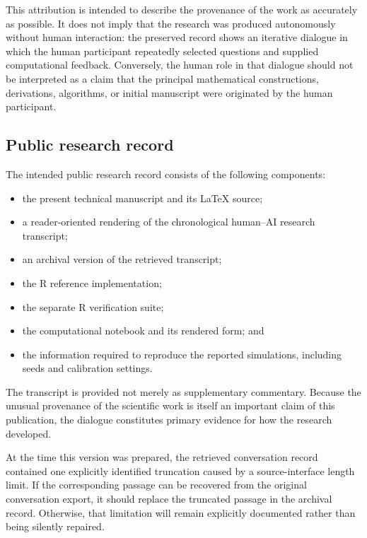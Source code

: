 \documentclass[11pt]{article}
\begin{document}
This attribution is intended to describe the provenance of the work as
accurately as possible.  It does not imply that the research was
produced autonomously without human interaction: the preserved record 
shows an iterative dialogue in which the human participant repeatedly
selected questions and supplied computational feedback.  Conversely,
the human role in that dialogue should not be interpreted as a claim
that the principal mathematical constructions, derivations, algorithms,
or initial manuscript were originated by the human participant.

\subsection*{Public research record}

The intended public research record consists of the following
components:

\begin{itemize}
    \item the present technical manuscript and its \LaTeX{} source;
    \item a reader-oriented rendering of the chronological
          human--AI research transcript;
    \item an archival version of the retrieved transcript;
    \item the R reference implementation;
    \item the separate R verification suite;
    \item the computational notebook and its rendered form; and
    \item the information required to reproduce the reported
          simulations, including seeds and calibration settings.
\end{itemize}

The transcript is provided not merely as supplementary commentary.
Because the unusual provenance of the scientific work is itself an
important claim of this publication, the dialogue constitutes primary
evidence for how the research developed.

At the time this version was prepared, the retrieved conversation
record contained one explicitly identified truncation caused by a
source-interface length limit.  If the corresponding passage can be
recovered from the original conversation export, it should replace the
truncated passage in the archival record.  Otherwise, that limitation
will remain explicitly documented rather than being silently repaired.
\end{document}
